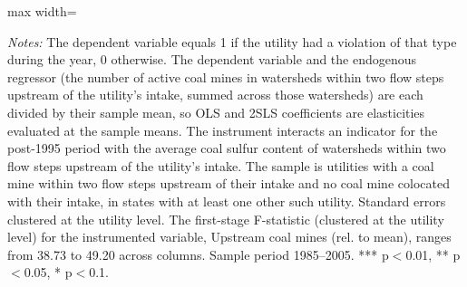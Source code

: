 \begin{table}[htbp]
{\begin{adjustbox}{max width=\linewidth}
\begin{tabular}
\bottomrule
\end{tabular}
\end{adjustbox}
}
\begin{minipage}{\linewidth}
\vspace{4pt}
\footnotesize
\raggedright
\textit{Notes:} The dependent variable equals 1 if the utility had a violation of that type during the year, 0 otherwise. The dependent variable and the endogenous regressor (the number of active coal mines in watersheds within two flow steps upstream of the utility's intake, summed across those watersheds) are each divided by their sample mean, so OLS and 2SLS coefficients are elasticities evaluated at the sample means. The instrument interacts an indicator for the post-1995 period with the average coal sulfur content of watersheds within two flow steps upstream of the utility's intake. The sample is utilities with a coal mine within two flow steps upstream of their intake and no coal mine colocated with their intake, in states with at least one other such utility. Standard errors clustered at the utility level. The first-stage F-statistic (clustered at the utility level) for the instrumented variable, Upstream coal mines (rel. to mean), ranges from 38.73 to 49.20 across columns. Sample period 1985--2005. *** p$<$0.01, ** p$<$0.05, * p$<$0.1.
\end{minipage}
\end{table}
